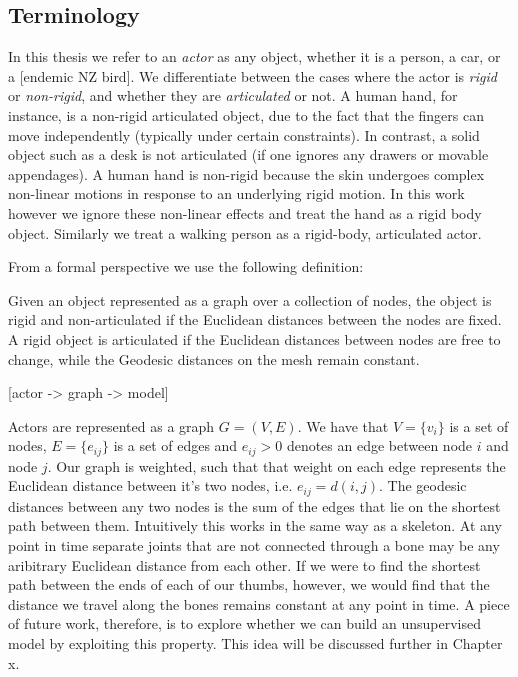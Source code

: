 \subsection{Terminology}

In this thesis we refer to an \textit{actor} as any object, whether it is a person, a car, or a [endemic NZ bird]. We differentiate between the cases where the actor is \textit{rigid} or \textit{non-rigid}, and whether they are \textit{articulated} or not. A human hand, for instance, is a non-rigid articulated object, due to the fact that the fingers can move independently (typically under certain constraints). In contrast, a solid object such as a desk is not articulated (if one ignores any drawers or movable appendages). A human hand is non-rigid because the skin undergoes complex non-linear motions in response to an underlying rigid motion. In this work however we ignore these non-linear effects and treat the hand as a rigid body object. Similarly we treat a walking person as a rigid-body, articulated actor. 

From a formal perspective we use the following definition:

\theoremstyle{definition}
\begin{definition}
\label{articulatedActor}
Given an object represented as a graph over a collection of nodes, the object is rigid and non-articulated if the Euclidean distances between the nodes are fixed. A rigid object is articulated if the Euclidean distances between nodes are free to change, while the Geodesic distances on the mesh remain constant. 
\end{definition}

[actor -> graph -> model]

Actors are represented as a graph $G = (V, E)$. We have that $V = \{v_i\}$ is a set of nodes, $E = \{e_{ij}\}$ is a set of edges and $e_{ij} > 0$ denotes an edge between node $i$ and node $j$. Our graph is weighted, such that that weight on each edge represents the Euclidean distance between it's two nodes, i.e. $e_{ij} = d(i,j)$. The geodesic distances between any two nodes is the sum of the edges that lie on the shortest path between them. Intuitively this works in the same way as a skeleton. At any point in time separate joints that are not connected through a bone may be any aribitrary Euclidean distance from each other. If we were to find the shortest path between the ends of each of our thumbs, however, we would find that the distance we travel along the bones remains constant at any point in time. A piece of future work, therefore, is to explore whether we can build an unsupervised model by exploiting this property. This idea will be discussed further in Chapter x.

